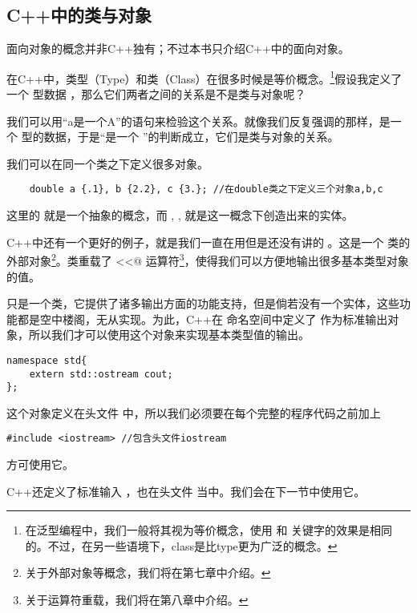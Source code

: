\subsection*{C++中的类与对象}
面向对象的概念并非C++独有；不过本书只介绍C++中的面向对象。\par
在C++中，类型（Type）和类（Class）在很多时候是等价概念。\footnote{在泛型编程中，我们一般将其视为等价概念，使用 \lstinline@typename@ 和 \lstinline@class@ 关键字的效果是相同的。不过，在另一些语境下，class是比type更为广泛的概念。}假设我定义了一个 \lstinline@int@ 型数据 \lstinline@i@，那么它们两者之间的关系是不是类与对象呢？\par
我们可以用``a是一个A''的语句来检验这个关系。就像我们反复强调的那样，\lstinline@i@ 是一个 \lstinline@int@ 型的数据，于是``\lstinline@i@ 是一个 \lstinline@int@''的判断成立，它们是类与对象的关系。\par
我们可以在同一个类之下定义很多对象。
\begin{lstlisting}
    double a {.1}, b {2.2}, c {3.}; //在double类之下定义三个对象a,b,c
\end{lstlisting}
这里的 \lstinline@double@ 就是一个抽象的概念，而 \lstinline@a@, \lstinline@b@, \lstinline@c@ 就是这一概念下创造出来的实体。\par
C++中还有一个更好的例子，就是我们一直在用但是还没有讲的 \lstinline@cout@。这是一个 \lstinline@ostream@ 类的外部对象\footnote{关于外部对象等概念，我们将在第七章中介绍。}。\lstinline@ostream@ 类重载了 \lstinline@<<@ 运算符\footnote{关于运算符重载，我们将在第八章中介绍。}，使得我们可以方便地输出很多基本类型对象的值。\par
\lstinline@ostream@ 只是一个类，它提供了诸多输出方面的功能支持，但是倘若没有一个实体，这些功能都是空中楼阁，无从实现。为此，C++在 \lstinline@std@ 命名空间中定义了 \lstinline@cout@ 作为标准输出对象，所以我们才可以使用这个对象来实现基本类型值的输出。
\begin{lstlisting}
namespace std{
    extern std::ostream cout;
};
\end{lstlisting}
这个对象定义在头文件 \lstinline@iostream@ 中，所以我们必须要在每个完整的程序代码之前加上
\begin{lstlisting}
#include <iostream> //包含头文件iostream
\end{lstlisting}
方可使用它。\par
C++还定义了标准输入 \lstinline@cin@，也在头文件 \lstinline@iostream@ 当中。我们会在下一节中使用它。\par
